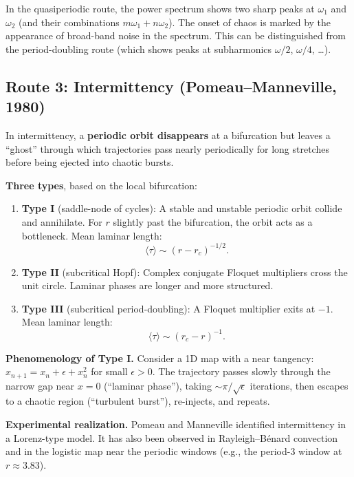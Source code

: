 \documentclass[11pt,letterpaper]{article}
\theoremstyle{definition}
\theoremstyle{plain}
\theoremstyle{remark}
\begin{document}
\begin{physicalnote}
In the quasiperiodic route, the power spectrum shows two sharp peaks at
$\omega_1$ and $\omega_2$ (and their combinations $m\omega_1+n\omega_2$).
The onset of chaos is marked by the appearance of broad-band noise in
the spectrum.  This can be distinguished from the period-doubling route
(which shows peaks at subharmonics $\omega/2$, $\omega/4$, \ldots).
\end{physicalnote}

\subsection{Route 3: Intermittency (Pomeau--Manneville, 1980)}

In intermittency, a \textbf{periodic orbit disappears} at a bifurcation
but leaves a ``ghost'' through which trajectories pass nearly periodically
for long stretches before being ejected into chaotic bursts.

\textbf{Three types}, based on the local bifurcation:
\begin{enumerate}[leftmargin=2em]
\item \textbf{Type I} (saddle-node of cycles): A stable and unstable
  periodic orbit collide and annihilate.  For $r$ slightly past the
  bifurcation, the orbit acts as a bottleneck.  Mean laminar length:
  \[
    \langle\tau\rangle \sim (r - r_c)^{-1/2}.
  \]
\item \textbf{Type II} (subcritical Hopf): Complex conjugate Floquet
  multipliers cross the unit circle.  Laminar phases are longer and
  more structured.
\item \textbf{Type III} (subcritical period-doubling): A Floquet
  multiplier exits at $-1$.  Mean laminar length:
  \[
    \langle\tau\rangle \sim (r_c - r)^{-1}.
  \]
\end{enumerate}

\textbf{Phenomenology of Type I.}  Consider a 1D map with a near
tangency: $x_{n+1} = x_n + \epsilon + x_n^2$ for small $\epsilon > 0$.
The trajectory passes slowly through the narrow gap near $x=0$
(``laminar phase''), taking $\sim \pi/\sqrt{\epsilon}$ iterations,
then escapes to a chaotic region (``turbulent burst''), re-injects,
and repeats.

\textbf{Experimental realization.}  Pomeau and Manneville identified
intermittency in a Lorenz-type model.  It has also been observed in
Rayleigh--B\'enard convection and in the logistic map near the periodic
windows (e.g., the period-3 window at $r \approx 3.83$).
\end{document}
